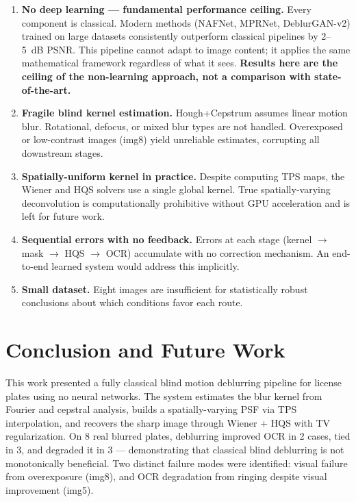 \documentclass[12pt,a4paper]{article}
\begin{document}
\begin{enumerate}[noitemsep, topsep=2pt]
  \item \textbf{No deep learning --- fundamental performance ceiling.}
    Every component is classical. Modern methods (NAFNet, MPRNet, DeblurGAN-v2) trained
    on large datasets consistently outperform classical pipelines by 2--5~dB PSNR.
    This pipeline cannot adapt to image content; it applies the same mathematical
    framework regardless of what it sees. \textbf{Results here are the ceiling of the
    non-learning approach, not a comparison with state-of-the-art.}

  \item \textbf{Fragile blind kernel estimation.}
    Hough+Cepstrum assumes linear motion blur. Rotational, defocus, or mixed blur types
    are not handled. Overexposed or low-contrast images (img8) yield unreliable estimates,
    corrupting all downstream stages.

  \item \textbf{Spatially-uniform kernel in practice.}
    Despite computing TPS maps, the Wiener and HQS solvers use a single global kernel.
    True spatially-varying deconvolution is computationally prohibitive without GPU
    acceleration and is left for future work.

  \item \textbf{Sequential errors with no feedback.}
    Errors at each stage (kernel $\to$ mask $\to$ HQS $\to$ OCR) accumulate with no
    correction mechanism. An end-to-end learned system would address this implicitly.

  \item \textbf{Small dataset.}
    Eight images are insufficient for statistically robust conclusions about which
    conditions favor each route.
\end{enumerate}

\section{Conclusion and Future Work}

This work presented a fully classical blind motion deblurring pipeline for license plates
using no neural networks. The system estimates the blur kernel from Fourier and cepstral
analysis, builds a spatially-varying PSF via TPS interpolation, and recovers the sharp
image through Wiener + HQS with TV regularization. On 8 real blurred plates, deblurring
improved OCR in 2 cases, tied in 3, and degraded it in 3 --- demonstrating that classical
blind deblurring is not monotonically beneficial. Two distinct failure modes were
identified: visual failure from overexposure (img8), and OCR degradation from ringing
despite visual improvement (img5).
\end{document}
